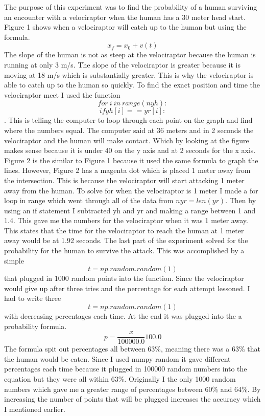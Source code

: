 \documentclass[twocolumn]{revtex4}
\begin{document}
The purpose of this experiment was to find the probability of a human surviving an encounter with a velociraptor when the human has a 30 meter head start. Figure 1 shows when a velociraptor will catch up to the human but using the formula. $$x_f = x_0 + v(t)$$ The slope of the human is not as steep at the velociraptor because the human is running at only 3 m/s. The slope of the velociraptor is greater because it is moving at 18 m/s which is substantially greater. This is why the velociraptor is able to catch up to the human so quickly. To find the exact position and time the velociraptor meet I used the function$$for~ i~ in~ range(nyh):$$
$$if yh[i] == yr[i]:$$. This is telling the computer to loop through each point on the graph and find where the numbers equal. The computer said at 36 meters and in 2 seconds the velociraptor and the human will make contact.  Which by looking at the figure makes sense because it is under 40 on the y axis and at 2 seconds for the x axis. Figure 2 is the similar to Figure 1 because it used the same formula to graph the lines. However, Figure 2 has a magenta dot which is placed 1 meter away from the intersection. This is because the velociraptor will start attacking 1 meter away from the human. To solve for when the velociraptor is 1 meter I made a for loop in range which went through all of the data from $nyr = len(yr)$. Then by using an if statement I subtracted yh and yr and making a range between 1 and 1.4. This gave me the numbers for the velociraptor when it was 1 meter away. This states that the time for the velociraptor to reach the human at 1 meter away would be at 1.92 seconds. The last part of the experiment solved for the probability for the human to survive the attack. This was accomplished by a simple $$ t = np.random.random(1)$$ that plugged in 1000 random points into the function. Since the velociraptor would give up after three tries and the percentage for each attempt lessoned. I had to write three $$ t = np.random.random(1)$$ with decreasing percentages each time. At the end it was plugged into the a probability formula. $$ p = \frac{x}{100000.0} 100.0$$ The formula spit out percentages all between 63\%, meaning there was a 63\%  that the human would be eaten. Since I used numpy random it gave different percentages each time because it plugged in 100000 random numbers into the equation but they were all within 63\%. Originally I the only 1000 random numbers which gave me a greater range of percentages between 60\% and 64\%. By increasing the number of points that will be plugged increases the accuracy which I mentioned earlier. 







\end{document}
